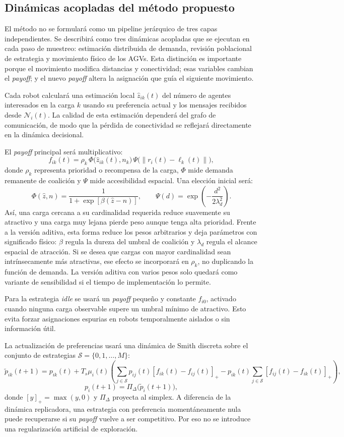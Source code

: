 \documentclass[11pt,a4paper]{article}
\begin{document}
\subsection{Dinámicas acopladas del método propuesto}

El método no se formulará como un pipeline jerárquico de tres capas independientes. Se describirá como tres dinámicas acopladas que se ejecutan en cada paso de muestreo: estimación distribuida de demanda, revisión poblacional de estrategia y movimiento físico de los AGVs. Esta distinción es importante porque el movimiento modifica distancias y conectividad; esas variables cambian el \textit{payoff}; y el nuevo \textit{payoff} altera la asignación que guía el siguiente movimiento.

Cada robot calculará una estimación local $\hat{z}_{ik}(t)$ del número de agentes interesados en la carga $k$ usando su preferencia actual y los mensajes recibidos desde $\mathcal{N}_i(t)$. La calidad de esta estimación dependerá del grafo de comunicación, de modo que la pérdida de conectividad se reflejará directamente en la dinámica decisional.

El \textit{payoff} principal será multiplicativo:
\[
f_{ik}(t)=\rho_k\,\Phi\big(\hat{z}_{ik}(t),n_k\big)\,\Psi\big(\|r_i(t)-\ell_k(t)\|\big),
\]
donde $\rho_k$ representa prioridad o recompensa de la carga, $\Phi$ mide demanda remanente de coalición y $\Psi$ mide accesibilidad espacial. Una elección inicial será:
\[
\Phi(\hat{z},n)=\frac{1}{1+\exp[\beta(\hat{z}-n)]},
\qquad
\Psi(d)=\exp\left(-\frac{d^2}{2\lambda_d^2}\right).
\]
Así, una carga cercana a su cardinalidad requerida reduce suavemente su atractivo y una carga muy lejana pierde peso aunque tenga alta prioridad. Frente a la versión aditiva, esta forma reduce los pesos arbitrarios y deja parámetros con significado físico: $\beta$ regula la dureza del umbral de coalición y $\lambda_d$ regula el alcance espacial de atracción. Si se desea que cargas con mayor cardinalidad sean intrínsecamente más atractivas, ese efecto se incorporará en $\rho_k$, no duplicando la función de demanda. La versión aditiva con varios pesos solo quedará como variante de sensibilidad si el tiempo de implementación lo permite.

Para la estrategia \textit{idle} se usará un \textit{payoff} pequeño y constante $f_{i0}$, activado cuando ninguna carga observable supere un umbral mínimo de atractivo. Esto evita forzar asignaciones espurias en robots temporalmente aislados o sin información útil.

La actualización de preferencias usará una dinámica de Smith discreta sobre el conjunto de estrategias $\mathcal{S}=\{0,1,\ldots,M\}$:
\[
\tilde{p}_{ik}(t+1)=p_{ik}(t)+T_s\mu_i(t)
\left(
\sum_{j\in\mathcal{S}}p_{ij}(t)[f_{ik}(t)-f_{ij}(t)]_+
-p_{ik}(t)\sum_{j\in\mathcal{S}}[f_{ij}(t)-f_{ik}(t)]_+
\right),
\]
\[
p_i(t+1)=\Pi_\Delta\big(\tilde{p}_i(t+1)\big),
\]
donde $[y]_+=\max(y,0)$ y $\Pi_\Delta$ proyecta al simplex. A diferencia de la dinámica replicadora, una estrategia con preferencia momentáneamente nula puede recuperarse si su \textit{payoff} vuelve a ser competitivo. Por eso no se introduce una regularización artificial de exploración.
\end{document}
